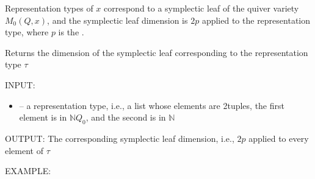 \documentclass[letterpaper,10pt,english]{sphinxmanual}
\begin{document}
\sphinxAtStartPar
Representation types of \(x\) correspond to a symplectic leaf of the quiver variety \(M_0(Q,x)\), and the symplectic leaf dimension is \(2p\) applied to the representation type, where \(p\) is the .

\begin{fulllineitems}
\label{\detokenize{index:quivercombinatorics.quivercombinatorics.Quiver.symplectic_leaf_dimension}}
\pysigstartsignatures
\pysiglinewithargsret
{}
{}
{}
\pysigstopsignatures
\sphinxAtStartPar
Returns the dimension of the symplectic leaf corresponding to the representation type \(\tau\)

\sphinxAtStartPar
INPUT:
\begin{itemize}
\item {} 
\sphinxAtStartPar
{} – a representation type, i.e., a list whose elements are 2\sphinxhyphen{}tuples, the first element is in \(\mathbb{N}Q_0\), and the second is in \(\mathbb{N}\)

\end{itemize}

\sphinxAtStartPar
OUTPUT: The corresponding symplectic leaf dimension, i.e., \(2p\) applied to every element of \(\tau\)

\sphinxAtStartPar
EXAMPLE:

\begin{sphinxVerbatim}[commandchars=\\\{\}]
  
   \PYG{p}{[}\PYG{p}{[} \PYG{p}{]}\PYG{p}{[} \PYG{p}{]}\PYG{p}{]}
 \PYG{p}{[}\PYG{p}{[}  \PYG{p}{]} \PYG{p}{[}  \PYG{p}{]}\PYG{p}{]}
\end{sphinxVerbatim}

\end{fulllineitems}
\end{document}
